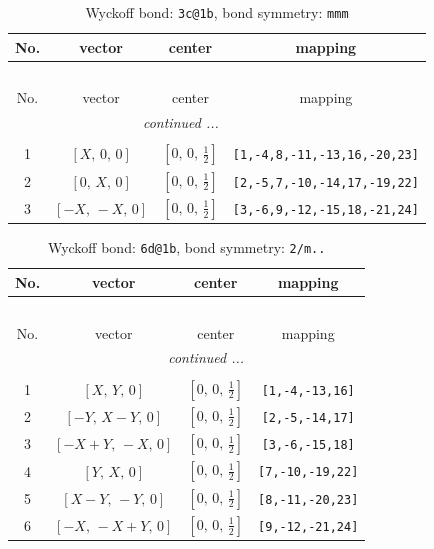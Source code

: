 \documentclass[fleqn,8pt]{jsarticle}
\begin{document}
\begin{longtable}{cccc}
\caption{Wyckoff bond: {\tt 3c@1b}, bond symmetry: {\tt mmm}}
 \\
 \hline \hline
No. & vector & center & mapping \\ \hline \endfirsthead

\multicolumn{3}{l}{\tablename\ \thetable{}} \\
 \hline \hline
No. & vector & center & mapping \\ \hline \endhead

 \hline \hline
\multicolumn{3}{r}{\footnotesize\it continued ...} \\ \endfoot

 \hline \hline
\multicolumn{3}{r}{} \\ \endlastfoot

1 & $\left[ X,\, 0,\, 0 \right]$ & $\left[ 0,\, 0,\, \frac{1}{2} \right]$ & {\tt [1,-4,8,-11,-13,16,-20,23]} \\ \hline
2 & $\left[ 0,\, X,\, 0 \right]$ & $\left[ 0,\, 0,\, \frac{1}{2} \right]$ & {\tt [2,-5,7,-10,-14,17,-19,22]} \\ \hline
3 & $\left[ - X,\, - X,\, 0 \right]$ & $\left[ 0,\, 0,\, \frac{1}{2} \right]$ & {\tt [3,-6,9,-12,-15,18,-21,24]} \\
\end{longtable}
\renewcommand{\arraystretch}{1.2}
\begin{longtable}{cccc}
\caption{Wyckoff bond: {\tt 6d@1b}, bond symmetry: {\tt 2/m..}}
 \\
 \hline \hline
No. & vector & center & mapping \\ \hline \endfirsthead

\multicolumn{3}{l}{\tablename\ \thetable{}} \\
 \hline \hline
No. & vector & center & mapping \\ \hline \endhead

 \hline \hline
\multicolumn{3}{r}{\footnotesize\it continued ...} \\ \endfoot

 \hline \hline
\multicolumn{3}{r}{} \\ \endlastfoot

1 & $\left[ X,\, Y,\, 0 \right]$ & $\left[ 0,\, 0,\, \frac{1}{2} \right]$ & {\tt [1,-4,-13,16]} \\ \hline
2 & $\left[ - Y,\, X - Y,\, 0 \right]$ & $\left[ 0,\, 0,\, \frac{1}{2} \right]$ & {\tt [2,-5,-14,17]} \\ \hline
3 & $\left[ - X + Y,\, - X,\, 0 \right]$ & $\left[ 0,\, 0,\, \frac{1}{2} \right]$ & {\tt [3,-6,-15,18]} \\ \hline
4 & $\left[ Y,\, X,\, 0 \right]$ & $\left[ 0,\, 0,\, \frac{1}{2} \right]$ & {\tt [7,-10,-19,22]} \\ \hline
5 & $\left[ X - Y,\, - Y,\, 0 \right]$ & $\left[ 0,\, 0,\, \frac{1}{2} \right]$ & {\tt [8,-11,-20,23]} \\ \hline
6 & $\left[ - X,\, - X + Y,\, 0 \right]$ & $\left[ 0,\, 0,\, \frac{1}{2} \right]$ & {\tt [9,-12,-21,24]} \\
\end{longtable}
\end{document}
